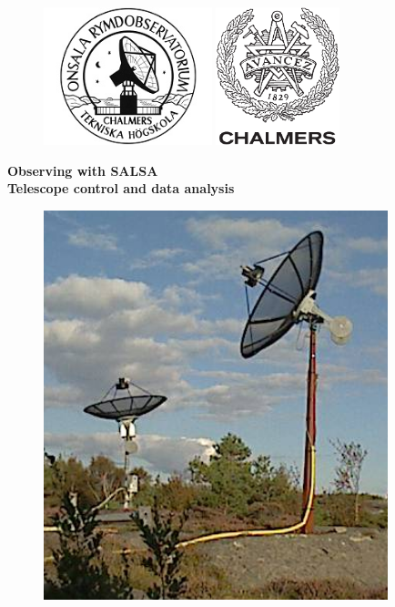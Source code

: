 \begin{titlepage}

\begin{figure}[t]
\vspace{-2cm}
\centering
\includegraphics[height=4cm]{../figures/OSO-logo.jpg}
\hspace{4cm}
\includegraphics[height=4cm]{../figures/CHALMERS-logo.pdf}
\vspace{1cm}
\end{figure}

\begin{center}
{\bf
{\Huge Observing with SALSA}\\
\bigskip
{\Huge Telescope control and data analysis}
}
\end{center}

\begin{figure}[!h]
\centering
\includegraphics[width=10cm]{../figures/SALSA.png}
\end{figure}



\end{titlepage}
